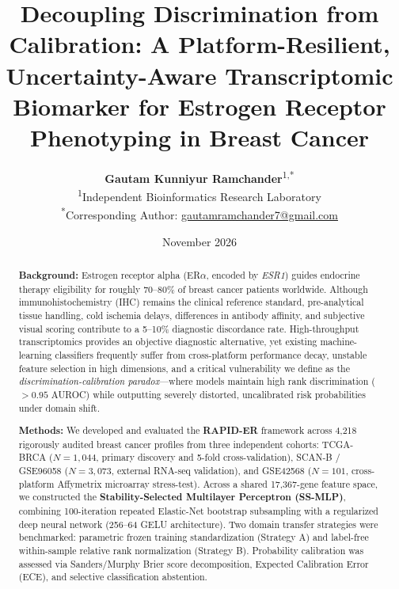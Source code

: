 \documentclass[11pt,a4paper]{article}
\title{\textbf{Decoupling Discrimination from Calibration: A Platform-Resilient, Uncertainty-Aware Transcriptomic Biomarker for Estrogen Receptor Phenotyping in Breast Cancer}}
\author{
  \textbf{Gautam Kunniyur Ramchander}\textsuperscript{1,*} \\
  \small\textsuperscript{1}Independent Bioinformatics Research Laboratory \\
  \small\textsuperscript{*}Corresponding Author: \href{mailto:gautamramchander7@gmail.com}{gautamramchander7@gmail.com}
}
\date{November 2026}
\begin{document}
\maketitle

\begin{abstract}
\noindent\textbf{Background:} Estrogen receptor alpha (ER$\alpha$, encoded by \textit{ESR1}) guides endocrine therapy eligibility for roughly 70--80\% of breast cancer patients worldwide. Although immunohistochemistry (IHC) remains the clinical reference standard, pre-analytical tissue handling, cold ischemia delays, differences in antibody affinity, and subjective visual scoring contribute to a 5--10\% diagnostic discordance rate. High-throughput transcriptomics provides an objective diagnostic alternative, yet existing machine-learning classifiers frequently suffer from cross-platform performance decay, unstable feature selection in high dimensions, and a critical vulnerability we define as the \textit{discrimination-calibration paradox}---where models maintain high rank discrimination ($>0.95$ AUROC) while outputting severely distorted, uncalibrated risk probabilities under domain shift.

\medskip
\noindent\textbf{Methods:} We developed and evaluated the \textbf{RAPID-ER} framework across 4,218 rigorously audited breast cancer profiles from three independent cohorts: TCGA-BRCA ($N = 1{,}044$, primary discovery and 5-fold cross-validation), SCAN-B / GSE96058 ($N = 3{,}073$, external RNA-seq validation), and GSE42568 ($N = 101$, cross-platform Affymetrix microarray stress-test). Across a shared 17,367-gene feature space, we constructed the \textbf{Stability-Selected Multilayer Perceptron (SS-MLP)}, combining 100-iteration repeated Elastic-Net bootstrap subsampling with a regularized deep neural network (256--64 GELU architecture). Two domain transfer strategies were benchmarked: parametric frozen training standardization (Strategy A) and label-free within-sample relative rank normalization (Strategy B). Probability calibration was assessed via Sanders/Murphy Brier score decomposition, Expected Calibration Error (ECE), and selective classification abstention.


\end{abstract}
\end{document}
